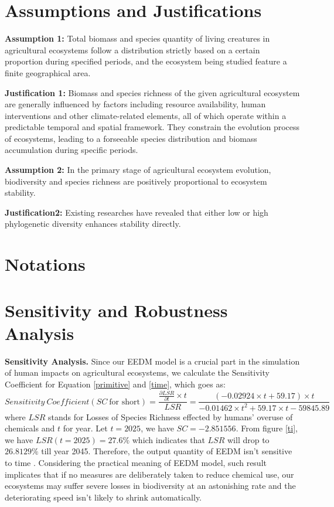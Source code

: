 \documentclass[12pt]{article}
\begin{document}
	\section{Assumptions and Justifications}
\hspace{1.5em}\textbf{Assumption 1: }Total biomass and species quantity of living creatures in agricultural ecosystems follow a distribution strictly based on a certain proportion during specified periods, and the ecosystem being studied feature a finite geographical area.

\textbf{Justification 1: }Biomass and species richness of the given agricultural ecosystem are generally  influenced by factors including resource availability, human interventions and other climate-related elements, all of which operate within a predictable temporal and spatial framework. They constrain the evolution process of ecosystems, leading to a forseeable species distribution and biomass accumulation during specific periods. 

\textbf{Assumption 2: }In the primary stage of agricultural ecosystem evolution, biodiversity and species richness are positively proportional to ecosystem stability.

\textbf{Justification2: }Existing researches \cite{1} \cite{2} \cite{3} have revealed that either low or high phylogenetic diversity enhances stability directly.
	
	
\section{Notations}
	
	
\section{Sensitivity and Robustness Analysis}
\hspace{2em}\textbf{Sensitivity Analysis. }Since our EEDM model is a crucial part in the simulation of human impacts on agricultural ecosystems, we calculate the Sensitivity Coefficient for Equation \ref{primitive} and \ref{time}, which goes as:
\begin{equation}
	Sensitivity\ Coefficient(SC\  \text{for short})=\frac{\frac{\partial LSR}{\partial t}\times t}{LSR}=\frac{(-0.02924\times t+59.17)\times t}{-0.01462\times t^2+59.17\times t-59845.89}
\end{equation}
where $LSR$ stands for Losses of Species Richness effected by humans' overuse of chemicals and $t$ for year. Let $t=2025$, we have $SC=-2.851556$. From figure \ref{ti}, we have $LSR(t=2025)=27.6\%$ which indicates that $LSR$ will drop to $26.8129\%$ till year 2045. Therefore, the output quantity of EEDM isn't sensitive to time . Considering the practical meaning of EEDM model, such result implicates that if no measures are deliberately taken to reduce chemical use, our ecosystems may suffer severe losses in biodiversity at an astonishing rate and the deteriorating speed isn't likely to shrink automatically.
\end{document}
